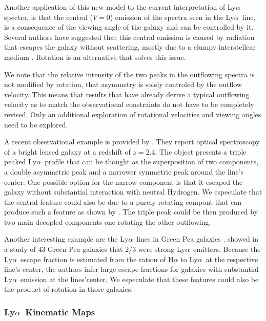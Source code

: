 \documentclass[a4paper,fleqn,usenatbib]{mnras}
\newcommand{\lya}{\ifmmode{{\rm Ly}\alpha}\else Ly$\alpha$\ \fi}
\begin{document}
Another application of this new model to the current interpretation of \lya
spectra, is that the central ($V=0$) emission of the spectra seen in the
\lya line, is a consequence of the viewing angle of the galaxy and can be
controlled by it. 
Several authors have suggested that this central emission is caused by
radiation that escapes the galaxy without scattering, mostly due to a
clumpy interstellear medium \citep{Hansen06, 2016ApJ...833L..26G}.
Rotation is an alternative that solves this issue. 

We note that the relative intensity of the two peaks in the outflowing
spectra is not modified by rotation, that asymmetry is solely
controled by the outflow velocity.
This means that results that have already derive a typical outflowing
velocity as to match the observational constraints do not have to be
completely revised. 
Only an additional exploration of rotational velocities and viewing
angles need to be explored.

A recent observational example is provided by
\cite{2017A&A...608L...4R}.
They report optical spectroscopy of a bright lensed galaxy at a
redshift of $z=2.4$. 
The object presents a triple peaked \lya profile that can be thought
as the superposition of two components, a double asymmetric peak and a
narrower symmetric peak around the line's center.
One possible option for the narrow component is that it escaped the
galaxy without substantial interaction with neutral Hydrogen.
We especulate that the central feature could also be due to a purely 
rotating compont that can produce such a feature as shown by
\cite{tololo}. The triple peak could be then produced by two main
decopled components one rotating the other outflowing.

Another interesting example are the \lya lines in Green Pea galaxies \citep{2016ApJ...820..130Y}.
\cite{2017ApJ...844..171Y} showed in a study of 43 Green Pea galaxies
that 2/3 were strong \lya emitters. 
Because the \lya escape fraction is estimated from the ration of
H$\alpha$ to \lya at the respective line's center, the authors infer
large escape fractions for galaxies with substantial \lya emission at
the lines'center.
We especulate that these features could also be the product of
rotation in those galaxies.



\subsubsection{\lya Kinematic Maps}
\end{document}
